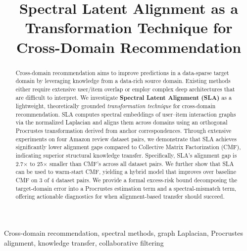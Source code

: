 \documentclass[conference]{IEEEtran}
\begin{document}
\title{Spectral Latent Alignment as a Transformation Technique for Cross-Domain Recommendation}

\author{
\and
{}
\and
{}
}

\maketitle

\begin{abstract}
Cross-domain recommendation aims to improve predictions in a data-sparse target domain by leveraging knowledge from a data-rich source domain. Existing methods either require extensive user/item overlap or employ complex deep architectures that are difficult to interpret. We investigate \textbf{Spectral Latent Alignment (SLA)} as a lightweight, theoretically grounded \emph{transformation technique} for cross-domain recommendation. SLA computes spectral embeddings of user--item interaction graphs via the normalized Laplacian and aligns them across domains using an orthogonal Procrustes transformation derived from anchor correspondences. Through extensive experiments on four Amazon review dataset pairs, we demonstrate that SLA achieves significantly lower alignment gaps compared to Collective Matrix Factorization (CMF), indicating superior structural knowledge transfer. Specifically, SLA's alignment gap is 2.7$\times$ to 25$\times$ smaller than CMF's across all dataset pairs. We further show that SLA can be used to warm-start CMF, yielding a hybrid model that improves over baseline CMF on 3 of 4 dataset pairs. We provide a formal excess-risk bound decomposing the target-domain error into a Procrustes estimation term and a spectral-mismatch term, offering actionable diagnostics for when alignment-based transfer should succeed.
\end{abstract}

\begin{IEEEkeywords}
Cross-domain recommendation, spectral methods, graph Laplacian, Procrustes alignment, knowledge transfer, collaborative filtering
\end{IEEEkeywords}
\end{document}
